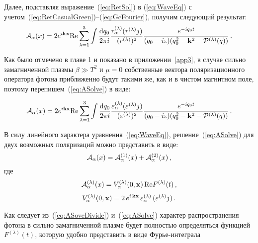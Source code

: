 Далее, подставляя выражение~(\ref{eq:RetSol}) в (\ref{eq:WaveEq}) с учетом~(\ref{eq:RetCasualGreen})--(\ref{eq:GcFourier}), получим следующий результат:
\begin{equation}\label{eq:ASolvePlasma}
	{\cal A}_\alpha(x) = 2 e^{i \mathbf{kx}} \mathrm{Re} \sum_{\lambda=1}^3 \int\frac{\mathrm{d} q_0}{2\pi i}\frac{r_\alpha^{(\lambda)}(r^{(\lambda)} j)}{(r^{(\lambda)})^2}\frac{e^{-i q_0 t}}{(q_0-i\varepsilon)(q_0^2-\mathbf{k}^2-{\cal P}^{(\lambda)}(q))}\, .
\end{equation}

Как было отмечено в главе 1 и показано в приложении~\ref{app3}, в случае сильно замагниченной плазмы $\beta\gg T^2$ и $\mu=0$ собственные вектора поляризационного оператора фотона приближенно будут такими же, как и в чистом магнитном поле, поэтому перепишем~(\ref{eq:ASolve}) в виде:

\begin{equation}\label{eq:ASolve}
	{\cal A}_\alpha(x) = 2 e^{i \mathbf{kx}} \mathrm{Re} \sum_{\lambda=1}^3 \int\frac{\mathrm{d} q_0}{2\pi i}\frac{\varepsilon_\alpha^{(\lambda)}(\varepsilon^{(\lambda)} j)}{(\varepsilon^{(\lambda)})^2}\frac{e^{-i q_0 t}}{(q_0-i\varepsilon)(q_0^2-\mathbf{k}^2-{\cal P}^{(\lambda)}(q))}\, .
\end{equation}

В силу линейного характера уравнения~(\ref{eq:WaveEq}), решение~(\ref{eq:ASolve}) для двух возможных поляризаций можно представить в виде:
\begin{equation}\label{eq:ASoveDivide}
	{\cal A}_\alpha(x)={\cal A}^{(1)}_\alpha(x)+{\cal A}^{(2)}_\alpha(x)\, ,
\end{equation}
где 
%
\begin{eqnarray}                        		
{\cal A}^{(\lambda)}_{\alpha} (x) = V^{(\lambda)}_\alpha (0, {\bf x}) \, \text{Re} F^{(\lambda)} (t) \, ,
\label{eq:V}
\end{eqnarray}
\begin{eqnarray}
V^{(\lambda)}_\alpha (0, {\bf x}) = 2\, e^{ i\, {\bf k x}} \, 
\varepsilon^{(\lambda)}_\alpha \, (\varepsilon^{(\lambda)} j)\, .
\label{eq:partialV}
\end{eqnarray}
%

Как следует из~(\ref{eq:ASoveDivide}) и~(\ref{eq:ASolve}) характер распространения фотона в сильно замагниченной плазме будет полностью определяться функцией $F^{(\lambda)} (t)$, которую удобно представить в виде Фурье-интеграла

